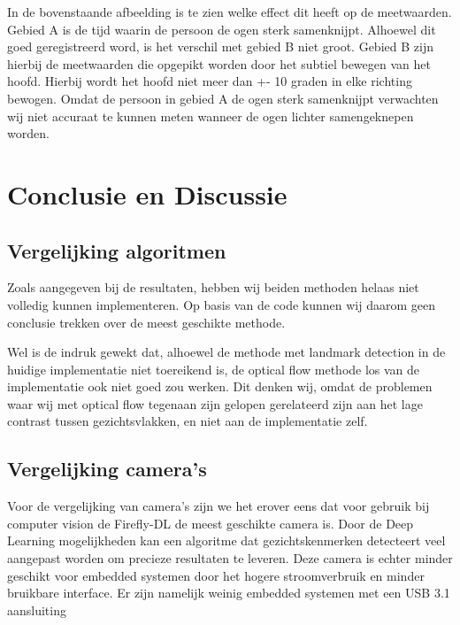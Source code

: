 \documentclass[11pt]{article}
\begin{document}
    \vspace{1em}
    In de bovenstaande afbeelding is te zien welke effect dit heeft op de meetwaarden.
    Gebied A is de tijd waarin de persoon de ogen sterk samenknijpt. Alhoewel dit goed geregistreerd word, is het verschil met gebied B niet groot.
    Gebied B zijn hierbij de meetwaarden die opgepikt worden door het subtiel bewegen van het hoofd. Hierbij wordt het hoofd niet meer
    dan +- 10 graden in elke richting bewogen. Omdat de persoon in gebied A de ogen sterk samenknijpt verwachten wij niet accuraat te kunnen meten
    wanneer de ogen lichter samengeknepen worden.



    \section{Conclusie en Discussie}\label{sec:conclusie-en-discussie}

    \subsection{Vergelijking algoritmen}
    Zoals aangegeven bij de resultaten, hebben wij beiden methoden helaas niet volledig kunnen implementeren.
    Op basis van de code kunnen wij daarom geen conclusie trekken over de meest geschikte methode.

    Wel is de indruk gewekt dat, alhoewel de methode met landmark detection in de huidige implementatie niet toereikend is,
    de optical flow methode los van de implementatie ook niet goed zou werken. Dit denken wij, omdat de problemen waar wij met optical
    flow tegenaan zijn gelopen gerelateerd zijn aan het lage contrast tussen gezichtsvlakken, en niet aan de implementatie zelf.





    \subsection{Vergelijking camera's}
    Voor de vergelijking van camera's zijn we het erover eens dat voor gebruik bij computer vision de Firefly-DL de meest geschikte camera is.
    Door de Deep Learning mogelijkheden kan een algoritme dat gezichtskenmerken detecteert veel aangepast worden om precieze resultaten te leveren.
    Deze camera is echter minder geschikt voor embedded systemen door het hogere stroomverbruik en minder bruikbare interface.
    Er zijn namelijk weinig embedded systemen met een USB 3.1 aansluiting\footnotemark[3]
\end{document}

